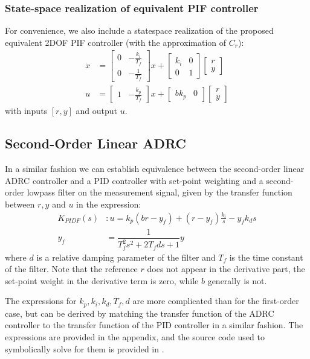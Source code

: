 \documentclass[letterpaper, 10 pt, conference]{ieeeconf}
\newcommand{\bmatrixx}[1]{\begin{bmatrix}#1\end{bmatrix}}
\begin{document}
\subsubsection{State-space realization of equivalent PIF controller}
For convenience, we also include a statespace realization of the proposed equivalent 2DOF PIF controller (with the approximation of $C_r$):
\begin{align*}
	\dot{x} &= \left[\begin{matrix}0 & - \frac{k_i}{T_f}\\0 & - \frac{1}{T_f}\end{matrix}\right]x + \left[\begin{matrix}k_i & 0\\0 & 1\end{matrix}\right]\bmatrixx{r \\ y} \\
	u &= \left[\begin{matrix}1 & - \frac{k_p}{T_f}\end{matrix}\right]x + \left[\begin{matrix}b k_p & 0\end{matrix}\right]\bmatrixx{r \\ y}
\end{align*}
with inputs $[r, y]$ and output $u$.



\subsection{Second-Order Linear ADRC}
In a similar fashion we can establish equivalence between the second-order linear ADRC controller and a PID controller with set-point weighting and a second-order lowpass filter on the measurement signal, given by the transfer function between $r,y$ and $u$ in the expression:
\begin{align}
	K_{PIDF}(s) &: u = k_p (br - y_f) + (r-y_f)\frac{k_i}{s} - y_fk_d s \\
	y_f &= \dfrac{1}{T_f^2s^2 + 2T_f d s + 1} y	
\end{align}
where $d$ is a relative damping parameter of the filter and $T_f$ is the time constant of the filter. Note that the reference $r$ does not appear in the derivative part, the set-point weight in the derivative term is zero, while $b$ generally is not.

The expressions for $k_p, k_i, k_d, T_f, d$ are more complicated than for the first-order case, but can be derived by matching the transfer function of the ADRC controller to the transfer function of the PID controller in a similar fashion. The expressions are provided in the appendix, and the source code used to symbolically solve for them is provided in \cite{repo}.
\end{document}
